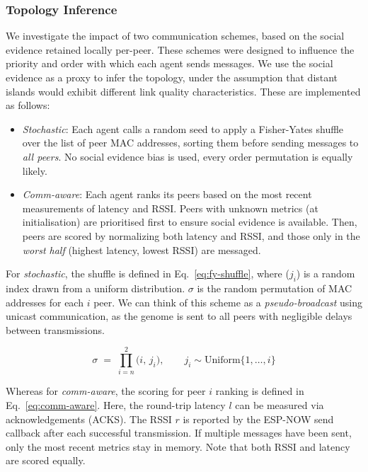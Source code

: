 \documentclass[conference]{IEEEtran}
\begin{document}
\subsubsection{Topology Inference}\label{sec:topology-inference}

We investigate the impact of two communication schemes, based on the social evidence retained locally per-peer. These schemes were designed to influence the priority and order with which each agent sends messages. We use the social evidence as a proxy to infer the topology, under the assumption that distant islands would exhibit different link quality characteristics. These are implemented as follows:

\begin{itemize}
    \item \emph{Stochastic}: Each agent calls a random seed to apply a Fisher-Yates shuffle \cite{fisher_statistical_1963} over the list of peer MAC addresses, sorting them before sending messages to \emph{all peers}. No social evidence bias is used, every order permutation is equally likely.
    \item \emph{Comm-aware}: Each agent ranks its peers based on the most recent measurements of latency and RSSI. Peers with unknown metrics (at initialisation) are prioritised first to ensure social evidence is available. Then, peers are scored by normalizing both latency and RSSI, and those only in the \emph{worst half} (highest latency, lowest RSSI) are messaged.
\end{itemize}

For \emph{stochastic}, the shuffle is defined in Eq.~\ref{eq:fy-shuffle}, where ($j_i$) is a random index drawn from a uniform distribution. $\sigma$ is the random permutation of MAC addresses for each $i$ peer. We can think of this scheme as a \emph{pseudo-broadcast} using unicast communication, as the genome is sent to all peers with negligible delays between transmissions.

\begin{equation}\label{eq:fy-shuffle}
\sigma \;=\; \prod_{i=n}^{2} \bigl(i,\, j_i\bigr), 
\qquad j_i \sim \mathrm{Uniform}\{1,\dots,i\}
\end{equation}

Whereas for \emph{comm-aware}, the scoring for peer $i$ ranking is defined in Eq.~\ref{eq:comm-aware}. Here, the round-trip latency $l$ can be measured via acknowledgements (ACKS). The RSSI $r$ is reported by the ESP-NOW send callback after each successful transmission. If multiple messages have been sent, only the most recent metrics stay in memory. Note that both RSSI and latency are scored equally.
\end{document}
